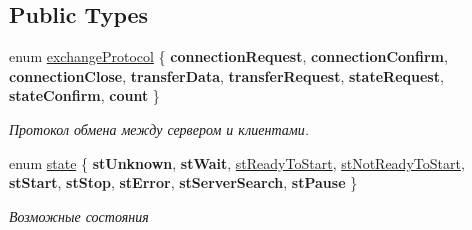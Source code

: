 \subsection*{Public Types}
\begin{DoxyCompactItemize}
\item 
\mbox{\label{class_t_connection_aa46ea2e762c48455dece26c126251aeb}} 
enum \hyperlink{class_t_connection_aa46ea2e762c48455dece26c126251aeb}{exchange\+Protocol} \{ \newline
{\bfseries connection\+Request}, 
{\bfseries connection\+Confirm}, 
{\bfseries connection\+Close}, 
{\bfseries transfer\+Data}, 
\newline
{\bfseries transfer\+Request}, 
{\bfseries state\+Request}, 
{\bfseries state\+Confirm}, 
{\bfseries count}
 \}\begin{DoxyCompactList}\small\item\em Протокол обмена между сервером и клиентами. \end{DoxyCompactList}
\item 
enum \hyperlink{class_t_connection_a93c51547a49faa91936324245c95b7b3}{state} \{ \newline
{\bfseries st\+Unknown}, 
{\bfseries st\+Wait}, 
\hyperlink{class_t_connection_a93c51547a49faa91936324245c95b7b3ac673f7deea576e6e3f26d38b392c85ad}{st\+Ready\+To\+Start}, 
\hyperlink{class_t_connection_a93c51547a49faa91936324245c95b7b3ae98ac105f75a0d6b3aa76553841add2b}{st\+Not\+Ready\+To\+Start}, 
\newline
{\bfseries st\+Start}, 
{\bfseries st\+Stop}, 
{\bfseries st\+Error}, 
{\bfseries st\+Server\+Search}, 
\newline
{\bfseries st\+Pause}
 \}\begin{DoxyCompactList}\small\item\em Возможные состояния \end{DoxyCompactList}
\end{DoxyCompactItemize}
